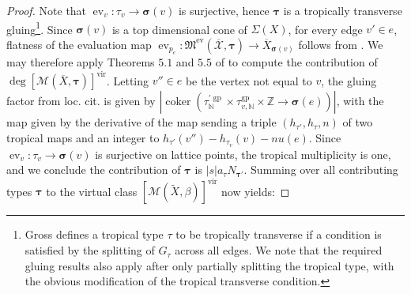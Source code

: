 \documentclass[12pt, oneside]{amsart}   	%
\newcommand{\NN}{\mathbb{N}}
\newcommand{\ZZ}{\mathbb{Z}}
\newcommand{\vir}{\operatorname{vir}}
\newcommand{\pt}{\operatorname{pt}}
\newcommand{\ev}{\operatorname{ev}}
\newcommand{\gp}{\operatorname{gp}}
\newcommand{\out}{\operatorname{out}}
\newcommand{\coker}{\operatorname{coker}}
\numberwithin{equation}{section}
\numberwithin{thm}{section}
\numberwithin{figure}{section}
\begin{document}
\begin{proof}



Note that $\ev_v: \tau_v \rightarrow \pmb\sigma(v)$ is surjective, hence $\pmb\tau$ is a tropically transverse gluing\footnote{Gross defines a tropical type $\tau$ to be tropically transverse if a condition is satisfied by the splitting of $G_{\tau}$ across all edges. We note that the required gluing results also apply after only partially splitting the tropical type, with the obvious modification of the tropical transverse condition.}. Since $\pmb\sigma(v)$ is a top dimensional cone of $\Sigma(X)$, for every edge $v' \in e$, flatness of the evaluation map $\ev_{p_e}: \mathfrak{M}^{\ev}(\overline{\mathcal{X}},\pmb\tau)\rightarrow \overline{X}_{\pmb\sigma(v)}$ follows from \cite[Theorem $5.3$]{trglue}. We may therefore apply Theorems $5.1$ and $5.5$ of \cite{trglue} to compute the contribution of $\deg[\mathscr{M}(\overline{X},\pmb\tau)]^{\vir}$. Letting $v'' \in e$ be the vertex not equal to $v$, the gluing factor from loc. cit. is given by $|\coker(\tau^{'\gp}_{\NN}\times\tau^{\gp}_{v,\NN}\times \ZZ \rightarrow \pmb\sigma(e))|$, with the map given by the derivative of the map sending a triple $(h_{\tau'},h_{\tau},n)$ of two tropical maps and an integer to $h_{\tau'}(v'') - h_{\tau_v}(v) - nu(e)$. Since $\ev_v: \tau_v \rightarrow \pmb\sigma(v)$ is surjective on lattice points, the tropical multiplicity is one, and we conclude the contribution of $\pmb\tau$ is $|s|a_{\tau}N_{\pmb\tau'}$. Summing over all contributing types $\pmb\tau$ to the virtual class $[\mathscr{M}(\widetilde{X},\beta)]^{\vir}$ now yields:





\end{proof}
\end{document}
